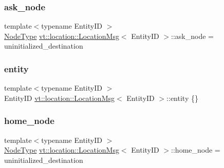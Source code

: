 \subsubsection{\texorpdfstring{ask\+\_\+node}{ask\_node}}
{\footnotesize\ttfamily template$<$typename Entity\+ID $>$ \\
\hyperlink{namespacevt_a866da9d0efc19c0a1ce79e9e492f47e2}{Node\+Type} \hyperlink{structvt_1_1location_1_1_location_msg}{vt\+::location\+::\+Location\+Msg}$<$ Entity\+ID $>$\+::ask\+\_\+node = uninitialized\+\_\+destination}

\mbox{\label{structvt_1_1location_1_1_location_msg_ab87a163a9f9f15780898870e0cba9b0e}} 
\subsubsection{\texorpdfstring{entity}{entity}}
{\footnotesize\ttfamily template$<$typename Entity\+ID $>$ \\
Entity\+ID \hyperlink{structvt_1_1location_1_1_location_msg}{vt\+::location\+::\+Location\+Msg}$<$ Entity\+ID $>$\+::entity \{\}}

\mbox{\label{structvt_1_1location_1_1_location_msg_a66a5eb7dc3383f583b04d2ecf66c7222}} 
\subsubsection{\texorpdfstring{home\+\_\+node}{home\_node}}
{\footnotesize\ttfamily template$<$typename Entity\+ID $>$ \\
\hyperlink{namespacevt_a866da9d0efc19c0a1ce79e9e492f47e2}{Node\+Type} \hyperlink{structvt_1_1location_1_1_location_msg}{vt\+::location\+::\+Location\+Msg}$<$ Entity\+ID $>$\+::home\+\_\+node = uninitialized\+\_\+destination}

\mbox{\label{structvt_1_1location_1_1_location_msg_a9550d842c2e1dcd3a5c48675c6b5c080}} 
